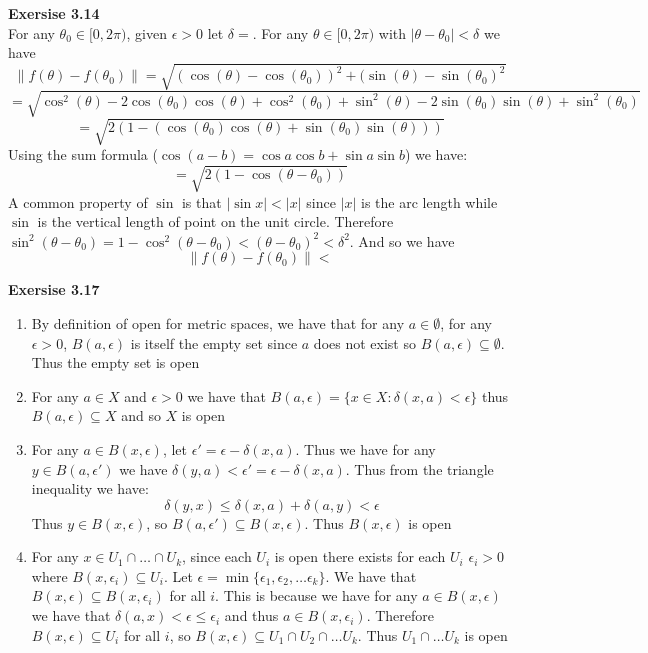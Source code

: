 \documentclass[12pt]{article}
\newenvironment{ques}[1]{\textbf{Exersise #1}\vspace{1 mm}\\ }{\bigskip}
\theoremstyle{definition}
\begin{document}
\begin{ques}{3.14}
	For any $\theta_0 \in [0,2\pi)$, given $\epsilon > 0$ let $\delta = $.
	For any $\theta \in [0,2\pi)$ with $|\theta - \theta_0| < \delta$ we
	have 
	$$\lVert f(\theta) - f(\theta_0) \rVert = \sqrt{(\cos(\theta) -
	\cos(\theta_0))^2 + (\sin(\theta) - \sin(\theta_0)^2}$$
	$$= \sqrt{\cos^2(\theta) - 2\cos(\theta_0)\cos(\theta) +
	\cos^2(\theta_0) +\sin^2(\theta) - 2\sin(\theta_0)\sin(\theta) +
	\sin^2(\theta_0)}$$
	$$= \sqrt{2(1 - (\cos(\theta_0)\cos(\theta) + \sin(\theta_0)\sin(\theta)))}$$
	Using the sum formula ($\cos(a - b) = \cos a\cos b + \sin a \sin b$) we have:
	$$= \sqrt{2(1 - \cos(\theta - \theta_0))}$$
	A common property of $\sin$ is that $|\sin x| < |x|$ since $|x|$ is the arc
	length while $\sin$ is the vertical length of point on the unit circle.
	Therefore $\sin^2 (\theta - \theta_0) = 1 - \cos^2 (\theta - \theta_0)
	< (\theta - \theta_0)^2 < \delta^2$. And so we have
	$$\lVert f(\theta) - f(\theta_0) \rVert < $$ 
	
\end{ques}

\begin{ques}{3.17}
	\begin{enumerate}
		\item
			By definition of open for metric spaces, we have that
			for any $a \in \emptyset$, for any $\epsilon > 0$,
			$B(a, \epsilon)$ is itself the empty set since $a$ does
			not exist so $B(a, \epsilon ) \subseteq \emptyset$.
			Thus the empty set is open
		\item
			For any $a \in X$ and $\epsilon > 0$ we have that $B(a,
			\epsilon) = \{x \in X: \delta(x,a) < \epsilon\}$ thus
			$B(a,\epsilon) \subseteq X$ and so $X$ is open
		\item
			For any $a \in B(x, \epsilon)$, let $ \epsilon' =
			\epsilon - \delta(x, a)$. Thus we have for any $y \in
			B(a, \epsilon')$ we have $\delta(y,a) < \epsilon' =
			\epsilon - \delta(x,a)$. Thus from the triangle
			inequality we have:
			$$\delta(y,x) \leq \delta(x,a) + \delta(a,y) < \epsilon$$
			Thus $y \in B(x, \epsilon)$, so $B(a, \epsilon')
			\subseteq B(x, \epsilon)$. Thus $B(x, \epsilon)$ is open
		\item
			For any $x \in U_1 \cap \dots \cap U_k$, since each
			$U_i$ is open there exists for each $U_i$ $\epsilon_i >
			0$ where $B(x, \epsilon_i) \subseteq U_i$. Let
			$\epsilon = \min \{\epsilon_1, \epsilon_2, \dots
			\epsilon_k \}$. We have that $B(x, \epsilon) \subseteq
			B(x, \epsilon_i)$ for all $i$. This is because we have
			for any $a \in B(x, \epsilon)$ we have that
			$\delta(a,x) < \epsilon \leq \epsilon_i$ and thus $a
			\in B(x, \epsilon_i)$. Therefore $B(x, \epsilon)
			\subseteq U_i$ for all $i$, so $B(x, \epsilon)
			\subseteq U_1 \cap U_2 \cap \dots U_k$. Thus $U_1 \cap
			\dots U_k$ is open
	\end{enumerate}
\end{ques}
\end{document}
